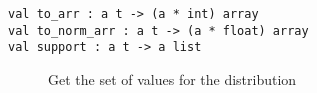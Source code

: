 \begin{description}
\item[{\protect\hyperlink{val-toux5farr}{}\texttt{val\ to\_arr\ :\ \textquotesingle{}a\ t\ -\textgreater{}\ (\textquotesingle{}a\ *\ int)\ array}\\
\protect\hyperlink{val-toux5fnormux5farr}{}\texttt{val\ to\_norm\_arr\ :\ \textquotesingle{}a\ t\ -\textgreater{}\ (\textquotesingle{}a\ *\ float)\ array}\\
\protect\hyperlink{val-support}{}\texttt{val\ support\ :\ \textquotesingle{}a\ t\ -\textgreater{}\ \textquotesingle{}a\ list}}]
Get the set of values for the distribution
\end{description}

